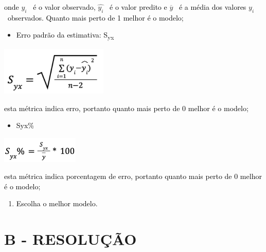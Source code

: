 \textcolor{black}{onde } $y_i$ \textcolor{black}{\ é o valor observado, } $\widehat {y_i}$ \textcolor{black}{\ é o valor
predito e } $\overline y$ \textcolor{black}{\ é a média dos valores } $y_i$ \textcolor{black}{\ observados. Quanto mais
perto de 1 melhor é o modelo;}



\begin{itemize}
\item \textcolor{black}{Erro padrão da estimativa: S}\textcolor{black}{\textsubscript{yx}}
\end{itemize}

\begin{center}
\includegraphics[width=5.117cm,height=2.32cm]{apendices/fig/IAA003_2.png} 
\end{center}

\textcolor{black}{esta métrica indica erro, portanto quanto mais perto de 0 melhor é o modelo;}



\begin{itemize}
\item \textcolor{black}{Syx\%}
\end{itemize}
\begin{center}
\includegraphics[width=3.688cm,height=1.235cm]{apendices/fig/IAA003_3.png}
\end{center}


\textcolor{black}{esta métrica indica porcentagem de erro, portanto quanto mais perto de 0 melhor é o modelo;}



\begin{enumerate}[resume*=listWWNumxx,start=7]
\item \textcolor{black}{Escolha o melhor modelo.}
\end{enumerate}

\section*{\textbf{B - RESOLUÇÃO}}

